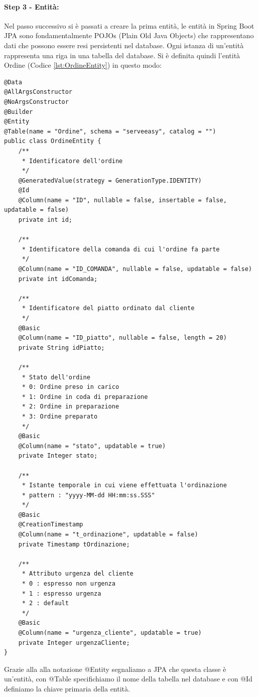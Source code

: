 \paragraph{Step 3 - Entità:}
Nel passo successivo si è passati a creare la prima entità, le entità in Spring Boot JPA sono fondamentalmente POJOs (Plain Old Java Objects) che rappresentano dati che possono essere resi persistenti nel database. Ogni istanza di un’entità rappresenta una riga in una tabella del database. Si è definita quindi l'entità Ordine (Codice \vref{lst:OrdineEntity}) in questo modo:
\begin{lstlisting}[style=myJava, 
    caption={Classe entità OrdineEntity.java}, label=lst:OrdineEntity, 
    emph={[2] urgenzaCliente, id, idComanda, idPiatto, stato, tOrdinazione},
    emphstyle={[2]\color{codeDarkMagenta}}]
@Data
@AllArgsConstructor
@NoArgsConstructor
@Builder
@Entity
@Table(name = "Ordine", schema = "serveeasy", catalog = "")
public class OrdineEntity {
    /**
     * Identificatore dell'ordine
     */
    @GeneratedValue(strategy = GenerationType.IDENTITY)
    @Id
    @Column(name = "ID", nullable = false, insertable = false, updatable = false)
    private int id;

    /**
     * Identificatore della comanda di cui l'ordine fa parte
     */
    @Column(name = "ID_COMANDA", nullable = false, updatable = false)
    private int idComanda;

    /**
     * Identificatore del piatto ordinato dal cliente
     */
    @Basic
    @Column(name = "ID_piatto", nullable = false, length = 20)
    private String idPiatto;

    /**
     * Stato dell'ordine
     * 0: Ordine preso in carico
     * 1: Ordine in coda di preparazione
     * 2: Ordine in preparazione
     * 3: Ordine preparato
     */
    @Basic
    @Column(name = "stato", updatable = true)
    private Integer stato;

    /**
     * Istante temporale in cui viene effettuata l'ordinazione
     * pattern : "yyyy-MM-dd HH:mm:ss.SSS"
     */
    @Basic
    @CreationTimestamp
    @Column(name = "t_ordinazione", updatable = false)
    private Timestamp tOrdinazione;

    /**
     * Attributo urgenza del cliente
     * 0 : espresso non urgenza
     * 1 : espresso urgenza
     * 2 : default
     */
    @Basic
    @Column(name = "urgenza_cliente", updatable = true)
    private Integer urgenzaCliente;
}
\end{lstlisting}
Grazie alla alla notazione @Entity segnaliamo a JPA che questa classe è un’entità, con @Table  specifichiamo il nome della tabella nel database e con @Id definiamo la chiave primaria della entità.
